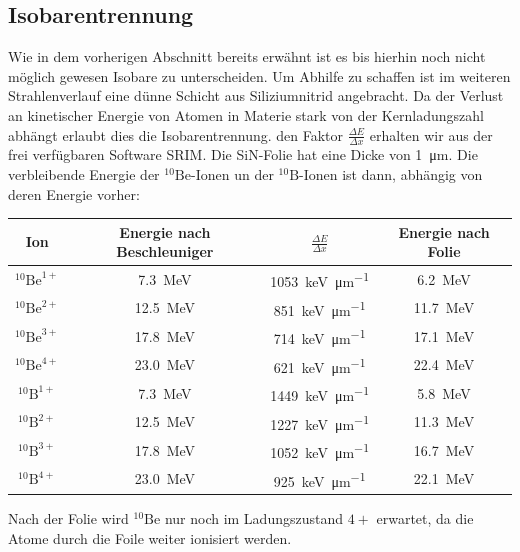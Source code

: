 \subsection{Isobarentrennung}
Wie in dem vorherigen Abschnitt bereits erwähnt ist es bis hierhin noch nicht möglich gewesen Isobare zu unterscheiden.
Um Abhilfe zu schaffen ist im weiteren Strahlenverlauf eine dünne Schicht aus Siliziumnitrid angebracht.
Da der Verlust an kinetischer Energie von Atomen in Materie stark von der Kernladungszahl abhängt erlaubt dies die Isobarentrennung.
den Faktor $\frac{\Delta E}{\Delta x}$ erhalten wir aus der frei verfügbaren Software SRIM.
Die SiN-Folie hat eine Dicke von \SI{1}{\micro\metre}.
Die verbleibende Energie der $^{10}\text{Be}$-Ionen un der $^{10}\text{B}$-Ionen ist dann, abhängig von deren Energie vorher:
\begin{center}
  \begin{tabular}{|c|c|c|c|}
    \hline
    Ion & Energie nach Beschleuniger & $\frac{\Delta E}{\Delta x}$ & Energie nach Folie \\
    \hline
    $^{10}\text{Be}^{1+}$ & \SI{7.3}{\mega\electronvolt}  & \SI{1053}{\kilo\electronvolt\per\micro\metre} & \SI{6.2}{\mega\electronvolt} \\
    $^{10}\text{Be}^{2+}$ & \SI{12.5}{\mega\electronvolt} & \SI{851}{\kilo\electronvolt\per\micro\metre} & \SI{11.7}{\mega\electronvolt} \\
    $^{10}\text{Be}^{3+}$ & \SI{17.8}{\mega\electronvolt} & \SI{714}{\kilo\electronvolt\per\micro\metre} & \SI{17.1}{\mega\electronvolt} \\
    $^{10}\text{Be}^{4+}$ & \SI{23.0}{\mega\electronvolt} & \SI{621}{\kilo\electronvolt\per\micro\metre} & \SI{22.4}{\mega\electronvolt} \\
    \hline
    $^{10}\text{B}^{1+}$ & \SI{7.3}{\mega\electronvolt}  & \SI{1449}{\kilo\electronvolt\per\micro\metre} & \SI{5.8}{\mega\electronvolt} \\
    $^{10}\text{B}^{2+}$ & \SI{12.5}{\mega\electronvolt} & \SI{1227}{\kilo\electronvolt\per\micro\metre} & \SI{11.3}{\mega\electronvolt} \\
    $^{10}\text{B}^{3+}$ & \SI{17.8}{\mega\electronvolt} & \SI{1052}{\kilo\electronvolt\per\micro\metre} & \SI{16.7}{\mega\electronvolt} \\
    $^{10}\text{B}^{4+}$ & \SI{23.0}{\mega\electronvolt} & \SI{925}{\kilo\electronvolt\per\micro\metre} & \SI{22.1}{\mega\electronvolt} \\
    \hline
  \end{tabular}
  \label{Auswertung_tab_Ionenenergien_nach_Folie}
\end{center}
Nach der Folie wird $^{10}\text{Be}$ nur noch im Ladungszustand $4+$ erwartet, da die Atome durch die Foile weiter ionisiert werden.

